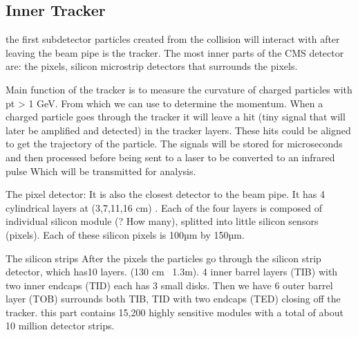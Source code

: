 \subsection{Inner Tracker}
the first subdetector particles created from the collision will interact with after leaving the beam pipe is the tracker. The most inner parts of the CMS detector are: the pixels, silicon microstrip detectors that surrounds the pixels.  
 
Main function of the tracker is to measure the curvature of charged particles with pt > 1 GeV. From which we can use to determine the momentum. When a charged particle goes through the tracker it will leave a hit (tiny signal that will later be amplified and detected) in the tracker layers. These hits could be aligned to get the trajectory of the particle. The signals will be stored for microseconds and then processed before being sent to a laser to be converted to an infrared pulse Which will be transmitted for analysis.  

The pixel detector: 
It is also the closest detector to the beam pipe. It has 4 cylindrical layers at (3,7,11,16 cm) . Each of the four layers is composed of individual silicon module (? How many), splitted into little silicon sensors (pixels).  Each of these silicon pixels is 100µm by 150µm.  

The silicon strips 
After the pixels the particles go through the silicon strip detector, which has10 layers. (130 cm~ 1.3m). 4 inner barrel layers (TIB) with two inner endcaps (TID) each has 3 small disks. Then we have 6 outer barrel layer (TOB) surrounds both TIB, TID with two endcaps (TED) closing off the tracker. this part contains 15,200 highly sensitive modules with a total of about 10 million detector strips.  

